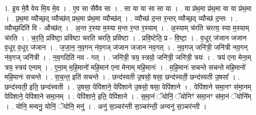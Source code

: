 \documentclass[17pt]{extarticle}
\begin{document}
1. इ॒य मे॒वै वेय मि॒य मे॒व । . ए॒व सा सैवैव सा । . सा या या सा सा या । . या प्र॑थ॒मा प्र॑थ॒मा या या प्र॑थ॒मा । . प्र॒थ॒मा व्यौच्छ॒द् व्यौच्छ॑त् प्रथ॒मा प्र॑थ॒मा व्यौच्छ॑त् । . व्यौच्छ॑ द॒न्त र॒न्तर् व्यौच्छ॒द् व्यौच्छ॑ द॒न्तः । . व्यौच्छ॒दिति॑ वि - औच्छ॑त् । . अ॒न्त र॒स्या म॒स्या म॒न्त र॒न्त र॒स्याम् । . अ॒स्याम् च॑रति चरत्य॒ स्या म॒स्याम् च॑रति । . च॒र॒ति॒ प्रवि॑ष्टा॒ प्रवि॑ष्टा चरति चरति॒ प्रवि॑ष्टा । . प्रवि॒ष्टेति॒ प्र - वि॒ष्टा॒ । . व॒धूर् ज॑जान जजान व॒धूर् व॒धूर् ज॑जान । . ज॒जा॒न॒ न॒व॒गन् न॑व॒गज् ज॑जान जजान नव॒गत् । . न॒व॒गज् जनि॑त्री॒ जनि॑त्री नव॒गन् न॑व॒गज् जनि॑त्री । . न॒व॒गदिति॑ नव - गत् । . जनि॑त्री॒ त्रय॒ स्त्रयो॒ जनि॑त्री॒ जनि॑त्री॒ त्रयः॑ । . त्रय॑ एना मेना॒म् त्रय॒ स्त्रय॑ एनाम् । . ए॒ना॒म् म॒हि॒मानो॑ महि॒मान॑ एना मेनाम् महि॒मानः॑ । . म॒हि॒मानः॑ सचन्ते सचन्ते महि॒मानो॑ महि॒मानः॑ सचन्ते । . स॒च॒न्त॒ इति॑ सचन्ते । . छन्द॑स्वती उ॒षसो॒ षसा॒ छन्द॑स्वती॒ छन्द॑स्वती उ॒षसा᳚ । . छन्द॑स्वती॒ इति॒ छन्द॑स्वती । . उ॒षसा॒ पेपि॑शाने॒ पेपि॑शाने उ॒षसो॒ षसा॒ पेपि॑शाने । . पेपि॑शाने समा॒नꣳ स॑मा॒नम् पेपि॑शाने॒ पेपि॑शाने समा॒नम् । . पेपि॑शाने॒ इति॒ पेपि॑शाने । . स॒मा॒नं ॅयोनिं॒ ॅयोनिꣳ॑ समा॒नꣳ स॑मा॒नं ॅयोनि᳚म् । . योनि॒ मन्वनु॒ योनिं॒ ॅयोनि॒ मनु॑ । . अनु॑ स॒ञ्चर॑न्ती स॒ञ्चर॑न्ती॒ अन्वनु॑ स॒ञ्चर॑न्ती । \newline
\end{document}
